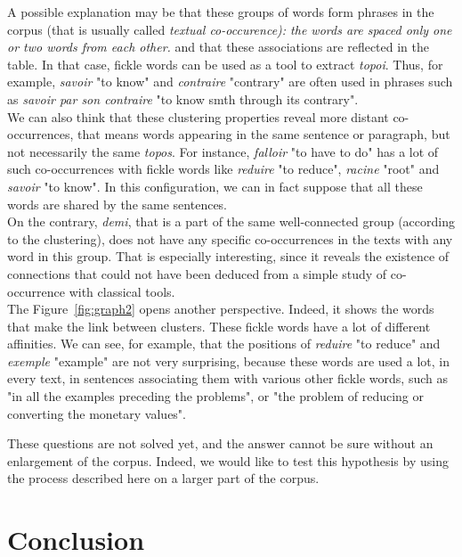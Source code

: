 \documentclass[preprint]{elsarticle}
\begin{document}
A possible explanation may be that these groups of words form phrases in the corpus (that is usually called \textit{textual co-occurence): the words are spaced only one or two words  from each other.} and that these associations are reflected in the table. In that case, fickle words can be used as a tool to extract \textit{topoi}. Thus, for example, \textit{savoir} "to know" and \textit{contraire} "contrary" are often used in phrases such as \textit{savoir par son contraire} "to know smth through its contrary".\\

We can also think that these clustering properties reveal more distant co-occurrences, that means words appearing in the same sentence or paragraph, but not necessarily the same \textit{topos}. For instance, \textit{falloir} "to have to do" has a lot of such co-occurrences with fickle words like \textit{reduire} "to reduce", \textit{racine} "root" and \textit{savoir} "to know". In this configuration, we can in fact suppose that all these words are shared by the same sentences.\\

On the contrary, \textit{demi}, that is a part of the same well-connected group (according to the clustering), does not have any specific co-occurrences in the texts with any word in this group. That is especially interesting, since it reveals the existence of connections that could not have been deduced from a simple study of co-occurrence with classical tools.\\

The Figure~\ref{fig:graph2} opens another perspective. Indeed, it shows the words that make the link between clusters. These fickle words have a lot of different affinities. We can see, for example, that the positions of \textit{reduire} "to reduce" and \textit{exemple} "example" are not very surprising, because these words are used a lot, in every text, in sentences associating them with various other fickle words, such as "in all the examples preceding the problems", or "the problem of reducing or converting the monetary values".

These questions are not solved yet, and the answer cannot be sure without an enlargement of the corpus. Indeed, we would like to test this hypothesis by using the process described here on a larger part of the corpus.

\section*{Conclusion}
\end{document}
